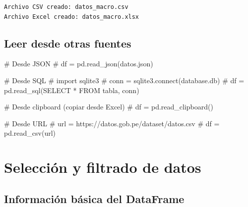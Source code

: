 \documentclass[
  doc,
  floatsintext,
  longtable,
  a4paper,
  nolmodern,
  notxfonts,
  notimes,
  12pt,
  colorlinks=true,linkcolor=blue,citecolor=blue,urlcolor=blue]{apa7}
\newenvironment{Shaded}{\begin{snugshade}}{\end{snugshade}}
\newcommand{\CommentTok}[1]{\textcolor[rgb]{0.37,0.37,0.37}{#1}}
\begin{document}
\begin{verbatim}
Archivo CSV creado: datos_macro.csv
Archivo Excel creado: datos_macro.xlsx
\end{verbatim}

\subsection{Leer desde otras fuentes}\label{leer-desde-otras-fuentes}

\begin{Shaded}
\begin{Highlighting}[]
\CommentTok{\# Desde JSON}
\CommentTok{\# df = pd.read\_json(\textquotesingle{}datos.json\textquotesingle{})}

\CommentTok{\# Desde SQL}
\CommentTok{\# import sqlite3}
\CommentTok{\# conn = sqlite3.connect(\textquotesingle{}database.db\textquotesingle{})}
\CommentTok{\# df = pd.read\_sql(\textquotesingle{}SELECT * FROM tabla\textquotesingle{}, conn)}

\CommentTok{\# Desde clipboard (copiar desde Excel)}
\CommentTok{\# df = pd.read\_clipboard()}

\CommentTok{\# Desde URL}
\CommentTok{\# url = \textquotesingle{}https://datos.gob.pe/dataset/datos.csv\textquotesingle{}}
\CommentTok{\# df = pd.read\_csv(url)}
\end{Highlighting}
\end{Shaded}

\section{Selección y filtrado de
datos}\label{selecciuxf3n-y-filtrado-de-datos}

\subsection{Información básica del
DataFrame}\label{informaciuxf3n-buxe1sica-del-dataframe}
\end{document}
